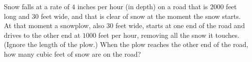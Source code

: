 Snow falls at a rate of $4$ inches per hour (in depth) on a road that is $2000$ feet long and $30$ feet wide, and that is clear of snow at the moment the snow starts. At that moment a snowplow, also $30$ feet wide, starts at one end of the road and drives to the other end at $1000$ feet per hour, removing all the snow it touches. (Ignore the length of the plow.) When the plow reaches the other end of the road, how many cubic feet of snow are on the road?
